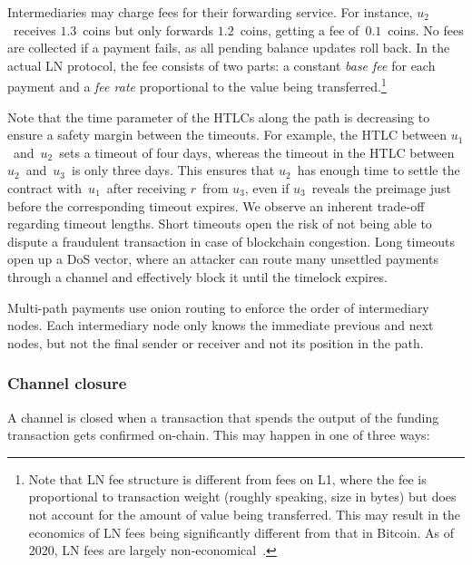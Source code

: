 Intermediaries may charge fees for their forwarding service.
For instance, $u_2$~receives $1.3$~coins but only forwards $1.2$~coins, getting a fee of~$0.1$~coins.
No fees are collected if a payment fails, as all pending balance updates roll back.
In the actual LN protocol, the fee consists of two parts: a constant \textit{base fee} for each payment and a \textit{fee rate} proportional to the value being transferred.\footnote{Note that LN fee structure is different from fees on L1, where the fee is proportional to transaction weight (roughly speaking, size in bytes) but does not account for the amount of value being transferred. This may result in the economics of LN fees being significantly different from that in Bitcoin. As of 2020, LN fees are largely non-economical~\cite{Beres2019}.}

Note that the time parameter of the HTLCs along the path is decreasing to ensure a safety margin between the timeouts.
For example, the HTLC between $u_1$~and~$u_2$~sets a timeout of four days, whereas the timeout in the HTLC between $u_2$~and~$u_3$~is only three days.
This ensures that $u_2$~has enough time to settle the contract with~$u_1$~after receiving $r$~from $u_3$, even if $u_3$~reveals the preimage just before the corresponding timeout expires.
We observe an inherent trade-off regarding timeout lengths.
Short timeouts open the risk of not being able to dispute a fraudulent transaction in case of blockchain congestion.
Long timeouts open up a DoS vector, where an attacker can route many unsettled payments through a channel and effectively block it until the timelock expires.

Multi-path payments use onion routing to enforce the order of intermediary nodes.
Each intermediary node only knows the immediate previous and next nodes, but not the final sender or receiver and not its position in the path.


\subsubsection*{Channel closure}

A channel is closed when a transaction that spends the output of the funding transaction gets confirmed on-chain.
This may happen in one of three ways:

